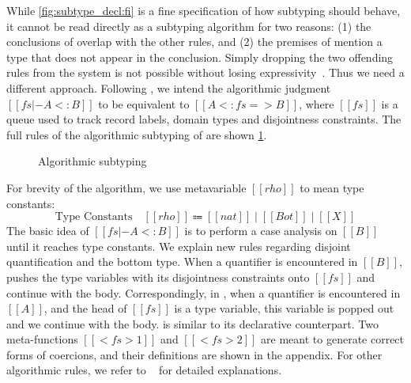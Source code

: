 While \cref{fig:subtype_decl:fi} is a fine specification of how subtyping
should behave, it cannot be read directly as a subtyping algorithm for two
reasons: (1) the conclusions of  overlap with the other
rules, and (2) the premises of  mention a type that does not
appear in the conclusion. Simply dropping the two offending rules
from the system is not possible without losing
expressivity~\cite{Laurent12note}. Thus we need a
different approach. Following \namee, we intend the algorithmic judgment $[[ fs |- A <: B ]]$ to be
equivalent to $[[ A <: fs => B ]]$, where $[[fs]]$ is a queue used to track record labels, domain types and disjointness constraints.
The full rules of the algorithmic subtyping of \fnamee are shown \cref{fig:algo:sub:fi}.



\renewcommand{\rulehl}[2][gray!40]{%
  \colorbox{#1}{$\displaystyle#2$}}

\begin{figure}[t]
  \centering
  \caption{Algorithmic subtyping}
  \label{fig:algo:sub:fi}
\end{figure}

\renewcommand{\rulehl}[1]{#1}



For brevity of the algorithm, we use metavariable $[[rho]]$ to mean type constants:
\[
  \text{Type Constants}\quad [[rho]] \Coloneqq  [[nat]] \mid [[Bot]] \mid [[X]]
\]
The basic idea of $[[ fs |- A <: B ]]$ is to perform a case analysis on $[[B]]$
until it reaches type constants. We explain new rules regarding disjoint
quantification and the bottom type.
When a quantifier is encountered in $[[B]]$,  pushes
the type variables with its disjointness constraints onto $[[fs]]$ and continue
with the body. Correspondingly, in , when a quantifier is
encountered in $[[A]]$, and the head of $[[fs]]$ is a type variable, this
variable is popped out and we continue with the body.
 is similar to its declarative counterpart.
Two meta-functions $[[ < fs >1 ]]$
and $[[ < fs >2 ]]$ are meant to generate correct forms of coercions, and their
definitions are shown in the appendix. For other algorithmic rules, we refer to
\namee~\cite{bi_et_al:LIPIcs:2018:9227} for detailed explanations.


